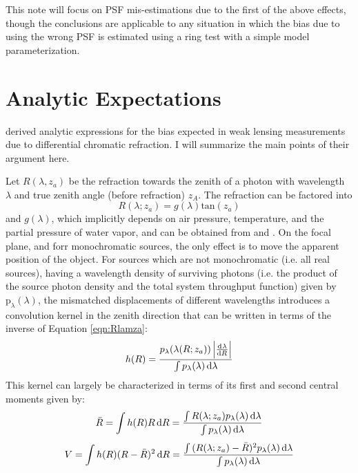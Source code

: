\documentclass[apj]{emulateapj}
\begin{document}
This note will focus on PSF mis-estimations due to the first of the
above effects, though the conclusions are applicable to any situation
in which the bias due to using the wrong PSF is estimated using a ring
test with a simple model parameterization.

\section{Analytic Expectations}\label{sec:analytic}
\citet{Plazas2012} derived analytic expressions for the bias expected
in weak lensing measurements due to differential chromatic refraction.
I will summarize the main points of their argument here.

Let $R(\lambda, z_a)$ be the refraction towards the zenith of a photon
with wavelength $\lambda$ and true zenith angle (before refraction)
$z_A$.  The refraction can be factored into
\begin{equation}
  R(\lambda; z_a) =  g(\lambda) \mathrm{tan}(z_a)
  \label{eqn:Rlamza}
\end{equation}
and $g(\lambda)$, which implicitly depends on air pressure,
temperature, and the partial pressure of water vapor, and can be
obtained from \citet{Edlen1953} and \citet{Coleman1960}.  On the focal
plane, and forr monochromatic sources, the only effect is to move the
apparent position of the object.  For sources which are not
monochromatic (i.e. all real sources), having a wavelength density of
surviving photons (i.e. the product of the source photon density and
the total system throughput function) given by
$\mathrm{p}_{\lambda}(\lambda)$, the mismatched displacements of
different wavelengths introduces a convolution kernel in the zenith
direction that can be written in terms of the inverse of Equation
\ref{eqn:Rlamza}:
\begin{equation}
  h(R) = \frac{p_\lambda(\lambda(R; z_a)) \left|\od{\lambda}{R}\right|}{\int{p_\lambda(\lambda) \dif{\lambda}}}
  \label{eqn:convker}
\end{equation}
This kernel can largely be characterized in terms of its first and
second central moments given by:
\begin{equation}
  \bar{R} = \int{h(R) R \dif{R} } = \frac{\int{R(\lambda; z_a) p_\lambda(\lambda)\dif{\lambda} }}{\int{p_\lambda(\lambda) \dif{\lambda}}}
  \label{eqn:rbar}
\end{equation}
\begin{equation}
  V = \int{h(R) (R - \bar{R})^2 \dif{R} } = \frac{\int{(R(\lambda; z_a) - \bar{R})^2 p_\lambda(\lambda)\dif{\lambda} }}{\int{p_\lambda(\lambda) \dif{\lambda}}}
  \label{eqn:V}
\end{equation}
\end{document}
